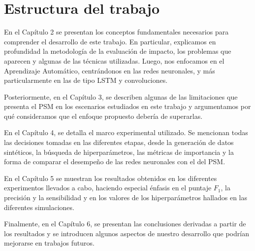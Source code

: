 \documentclass[../main.tex]{subfiles}
\begin{document}


\section{Estructura del trabajo}
En el Capítulo 2 se presentan los conceptos fundamentales necesarios para comprender el
desarrollo de este trabajo. En particular, explicamos en profundidad la metodología de la
evaluación de impacto, los problemas que aparecen y algunas de las técnicas utilizadas.
Luego, nos enfocamos en el Aprendizaje Automático, centrándonos en las redes neuronales, y
más particularmente en las de tipo LSTM y convoluciones.

Posteriormente, en el Capítulo 3, se describen algunas de las limitaciones que presenta el
PSM en los escenarios estudiados en este trabajo y argumentamos por qué consideramos que
el enfoque propuesto debería de superarlas.

En el Capítulo 4, se detalla el marco experimental utilizado. Se mencionan todas las
decisiones tomadas en las diferentes etapas, desde la generación de datos sintéticos, la
búsqueda de hiperparámetros, las métricas de importancia y la forma de comparar el
desempeño de las redes neuronales con el del PSM.

En el Capítulo 5 se muestran los resultados obtenidos en los diferentes experimentos
llevados a cabo, haciendo especial énfasis en el puntaje \(F_1\), la precisión y la
sensibilidad y en los valores de los hiperparámetros hallados en las diferentes
simulaciones.

Finalmente, en el Capítulo 6, se presentan las conclusiones derivadas a partir de los
resultados y se introducen algunos aspectos de nuestro desarrollo que podrían mejorarse en
trabajos futuros.
\end{document}
